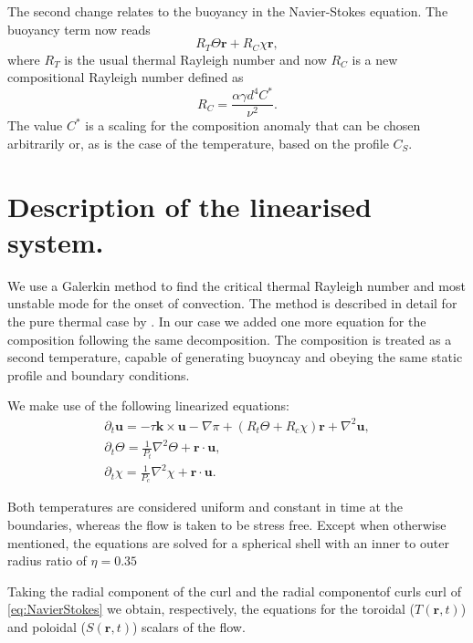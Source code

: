 \documentclass[a4paper,10pt]{book}
\renewcommand{\vec}[1]{\mathbf{#1}}
\begin{document}
The second change relates to the buoyancy in the Navier-Stokes equation. The
buoyancy term now reads
\begin{equation}
  R_T \Theta \vec r + R_C \chi \vec r,
\end{equation}
where $R_T$ is the usual thermal Rayleigh number and now $R_C$ is a new
compositional Rayleigh number defined as
\begin{equation}
 R_C = \frac{\alpha \gamma d^4 C^*}{\nu^2}.
\end{equation}
The value $C^*$ is a scaling for the composition anomaly that can be
chosen arbitrarily or, as is the case of the temperature, based on the profile
$C_S$.

\section{Description of the linearised system.}
\label{s:problemSetup}
We use a Galerkin method to find the critical thermal Rayleigh number and most
unstable mode for the onset of convection. The method is described in detail for
the pure thermal case by \citep{ZhangBusse87}. In our case we added one more
equation for the composition following the same decomposition. The composition
is treated as a second temperature, capable of generating buoyncay and obeying
the same static profile and boundary conditions.

We make use of the following linearized equations:
\begin{subequations}
\label{eqs:linearizedConvection}
\begin{gather}
\label{eq:NavierStokes}
\partial_t \vec u = - \tau \vec k \times \vec u - \nabla \pi + (R_t \Theta +R_c \chi )\vec r + \nabla^2 \vec u, \\
\label{eq:temperature}
\partial_t \Theta = \frac{1}{P_t}\nabla^2 \Theta + \vec r \cdot \vec u , \\
\label{eq:composition}
\partial_t \chi = \frac{1}{P_c}\nabla^2 \chi  + \vec r \cdot \vec u .
\end{gather}
\end{subequations}


Both temperatures are considered uniform and constant in time at the boundaries,
whereas the flow is taken to be stress free. Except when otherwise mentioned,
the equations are solved for a spherical shell with an inner to outer radius
ratio of $\eta=0.35$

Taking the radial component of the curl and the radial componentof curls curl of
\ref{eq:NavierStokes} we obtain, respectively, the equations for the toroidal
($T(\vec r,t)$) and poloidal ($S(\vec r,t)$) scalars of the flow.
\end{document}
